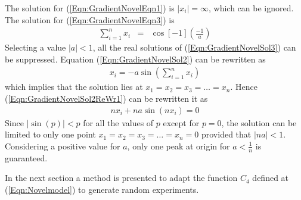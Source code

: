 \documentclass[twocolumn]{svjour3}          %
\begin{document}
The solution for (\ref{Eqn:GradientNovelEqn1}) is $|x_i|=\infty$, which can be ignored. The solution for (\ref{Eqn:GradientNovelEqn3}) is
\begin{eqnarray}
	\sum_{i=1}^{n} x_i &=& \cos[-1](\frac{-1}{a}) \label{Eqn:GradientNovelSol3}
\end{eqnarray}
Selecting a value $|a|<1$, all the real solutions of (\ref{Eqn:GradientNovelSol3})  can be suppressed. Equation (\ref{Eqn:GradientNovelSol2}) can be rewritten as 
\begin{eqnarray}
	x_i = -a\sin\left(\sum_{i=1}^{n} x_i\right) \label{Eqn:GradientNovelSol2ReWr1}
\end{eqnarray}
which implies that the solution lies at $x_1 = x_2 = x_3 = \dots = x_n$. Hence (\ref{Eqn:GradientNovelSol2ReWr1}) can be rewritten it as
\begin{eqnarray}
	nx_i + na\sin(nx_i) = 0 \label{Eqn:GradientNovelSol2ReWr2}
\end{eqnarray}
Since $|\sin(p)|<p$ for all the values of $p$ except for $p = 0$, the solution can be limited to only one point $x_1 = x_2 = x_3 = \dots = x_n=0$ provided that $|na|<1$. Considering a positive value for $a$, only one peak at origin for $a<\frac{1}{n}$ is  guaranteed.
\par
In the next section a method is presented to adapt the function $C_4$ defined at (\ref{Eqn:Novelmodel}) to generate random experiments.
\end{document}
